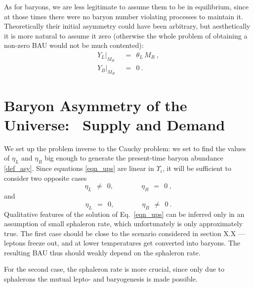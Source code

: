 \documentclass[12pt]{revtex4}
\begin{document}
	As for baryons, we are less legitimate to assume them to be in
	equilibrium, since at those times there were no baryon number
	violating processes to maintain it.
	Theoretically their initial asymmetry could have been arbitrary,
	but aesthetically it is more natural to assume it zero
	(otherwise the whole problem of obtaining a non-zero BAU would
	not be much contented):
\begin{align*}
	Y_L\bigl|_{M_R} & ~~=~~ \theta_L\, M_R~, \\
	Y_B\bigl|_{M_R} & ~~=~~ 0~.
\end{align*}
		


%
%
\section{Baryon Asymmetry of the Universe: ~Supply and Demand}

	We set up the problem inverse to the Cauchy problem:
	we set to find the values of $ \eta_L $ and $ \eta_B $ 
	big enough to generate the present-time baryon 
	abundance \eqref{def_asy}.
	Since equations \eqref{eqn_ups} are linear in $ \Upsilon_i $,
	it will be sufficient to consider two opposite cases
\[
	\eta_L ~~\neq~~ 0,\qquad\qquad \eta_B ~~=~~ 0~, 
\]
	and
\[
	\eta_L ~~=~~ 0,\qquad\qquad \eta_B ~~\neq~~ 0~.
\]
	Qualitative features of the solution of Eq.~\eqref{eqn_ups} can
	be inferred only in an assumption of small sphaleron rate,
	which unfortunately is only approximately true.
	The first case should be close to the scenario considered in
	section X.X --- 
	leptons freeze out, and at lower temperatures get converted
	into baryons. 
	The resulting BAU thus should weakly depend on the sphaleron
	rate.

	For the second case, the sphaleron rate is more crucial, since
	only due to sphalerons the mutual lepto- and baryogenesis is
	made possible. 
	
\end{document}
